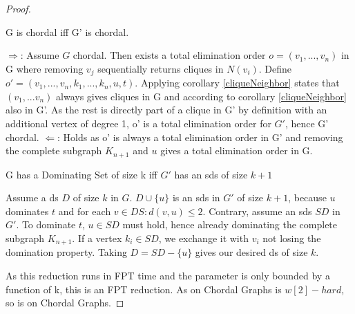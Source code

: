 \begin{proof}
    \begin{corollary}
    G is chordal iff G' is chordal.    
    \end{corollary}
    \begin{subproof}
    $\Rightarrow$: Assume $G$ chordal. Then exists a total elimination order $o = (v_1, ..., v_n)$ in G where removing $v_j$ sequentially returns cliques in $N(v_i)$.
    Define $o' = (v_1, ..., v_n, k_1, ..., k_n, u, t)$. Applying corollary \ref*{cliqueNeighbor} states that $(v_1, ... v_n)$ always gives cliques in G and according to corollary \ref*{cliqueNeighbor} also in G'. As the rest is directly part of a clique in G' by definition with an additional vertex of degree 1, o' is a total elimination order for $G'$, hence G' chordal.
    $\Leftarrow$: Holds as o' is always a total elimination order in G' and removing the complete subgraph $K_{n+1}$ and $u$ gives a total elimination order in G.
    \end{subproof}


    \begin{corollary}
    G has a Dominating Set of size k iff $G'$ has an sds of size $k+1$
    \end{corollary}
    \begin{subproof}
    Assume a ds $D$ of size $k$ in $G$. $D \cup \{u\}$ is an sds in $G'$ of size $k + 1$, because $u$ dominates $t$ and for each $v \in DS: d(v, u) \leq 2$.
    Contrary, assume an sds $SD$ in $G'$. To dominate $t$, $u \in SD$ must hold, hence already dominating the complete subgraph $K_{n+1}$. If a vertex $k_i \in SD$, we exchange it with $v_i$ not losing the domination property. Taking $D = SD - \{ u \}$ gives our desired ds of size $k$.
    \end{subproof}
    As this reduction runs in FPT time and the parameter is only bounded by a function of k, this is an FPT reduction. As \dom on Chordal Graphs is $w[2]-hard$, so is \sdom on Chordal Graphs.
\end{proof}

